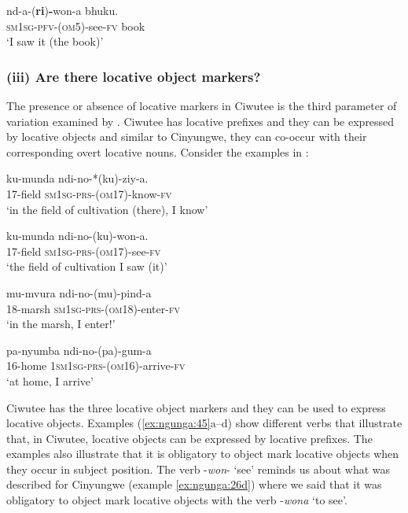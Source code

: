 \documentclass[output=paper]{langscibook}
\begin{document}
\ex\label{ex:ngunga:44b} \gll nd-a-(\textbf{ri})\textbf{{}-}won-a  bhuku.\\
{\textsc{sm1sg}-\textsc{pfv}}{}-(\textsc{om5})-see-\textsc{fv}    book\\
\glt ‘I saw it (the book)’
\z
\z

 \subsubsection{(iii) Are there locative object markers?}

The presence or absence of locative markers in Ciwutee is the third parameter of variation examined by \citet{MartenKula2012}. Ciwutee has locative prefixes and they can be expressed by locative objects and similar to Cinyungwe, they can co-occur with their corresponding overt locative nouns. Consider the examples in :        

\ea\label{ex:ngunga:45}
\ea\label{ex:ngunga:45a} \gll   ku-munda  ndi-no-*(ku)-ziy-a.\\
           17-field  {\textsc{sm1sg}-\textsc{prs}-(\textsc{om}17}){}-know-{\textsc{fv}}\\
\glt          ‘in the field of cultivation (there), I know’

\ex\label{ex:ngunga:45b} \gll   ku-munda  ndi-no-(ku)-won-a.\\
            17-field  {\textsc{sm1sg}-\textsc{prs}-(\textsc{om}17}){}-see-{\textsc{fv}}\\
\glt ‘the field of cultivation I saw (it)’    

\ex\label{ex:ngunga:45c} \gll mu-mvura  ndi-no-(mu)-pind-a\\
18-marsh  {\textsc{sm1sg}-\textsc{prs}-(\textsc{om}18}){}-enter-{\textsc{fv}}  \\
\glt ‘in the marsh, I enter!’

\ex\label{ex:ngunga:45d} \gll pa-nyumba  ndi-no-(pa)-gum-a\\
  16-home  1\textsc{sm1sg}-\textsc{prs}-(\textsc{om16})-arrive-\textsc{fv}\\
\glt ‘at home, I arrive’
    \z
\z

Ciwutee has the three locative object markers and they can be used to express locative objects. Examples (\ref{ex:ngunga:45}a--d) show different verbs that illustrate that, in Ciwutee, locative objects can be expressed by locative prefixes. The examples also illustrate that it is obligatory to object mark locative objects when they occur in subject position. The verb -\textit{won}{}- ‘see’  reminds us about what was described for Cinyungwe (example \ref{ex:ngunga:26d}) where we said that it was obligatory to object mark locative objects with the verb -\textit{wona} ‘to see’.
\end{document}
